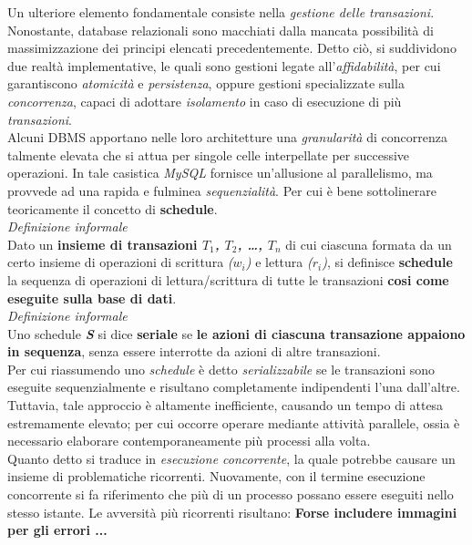 \documentclass{article}
\begin{document}
Un ulteriore elemento fondamentale consiste nella \textit{gestione delle transazioni}. Nonostante, database relazionali sono macchiati dalla mancata possibilità di massimizzazione dei principi elencati precedentemente. Detto ciò, si suddividono due realtà implementative, le quali sono gestioni legate all'\textit{affidabilità}, per cui garantiscono \textit{atomicità} e \textit{persistenza}, oppure gestioni specializzate sulla \textit{concorrenza}, capaci di adottare \textit{isolamento} in caso di esecuzione di più \textit{transazioni}.\vspace{14pt}\\
Alcuni DBMS apportano nelle loro architetture una \textit{granularità} di concorrenza talmente elevata che si attua per singole celle interpellate per successive operazioni. In tale casistica \textit{MySQL} fornisce un'allusione al parallelismo, ma provvede ad una rapida e fulminea \textit{sequenzialità}. Per cui è bene sottolinerare teoricamente il concetto di \textbf{schedule}.\vspace*{14pt}\\
\textit{Definizione informale}\\
Dato un \textbf{insieme di transazioni \textit{$T_1$, $T_2$, \dots, $T_n$}} di cui ciascuna formata da un certo insieme di operazioni di scrittura \textit{($w_i$)} e lettura \textit{($r_i$)}, si definisce \textbf{schedule} la sequenza di operazioni di lettura/scrittura di tutte le transazioni \textbf{cosi come eseguite sulla base di dati}.\vspace*{14pt}\\
\textit{Definizione informale}\\
Uno schedule \textbf{\textit{S}} si dice \textbf{seriale} se \textbf{le azioni di ciascuna transazione appaiono in sequenza}, senza essere interrotte da azioni di altre transazioni.\vspace*{14pt}\\
Per cui riassumendo uno \textit{schedule} è detto \textit{serializzabile} se le transazioni sono eseguite sequenzialmente e risultano completamente indipendenti l'una dall'altre. Tuttavia, tale approccio è altamente inefficiente, causando un tempo di attesa estremamente elevato; per cui occorre operare mediante attività parallele, ossia è necessario elaborare contemporaneamente più processi alla volta.\vspace*{14pt}\\
Quanto detto si traduce in \textit{esecuzione concorrente}, la quale potrebbe causare un insieme di problematiche ricorrenti. Nuovamente, con il termine esecuzione concorrente si fa riferimento che più di un processo possano essere eseguiti nello stesso istante. Le avversità più ricorrenti risultano: \textbf{Forse includere immagini per gli errori ...}
\end{document}
